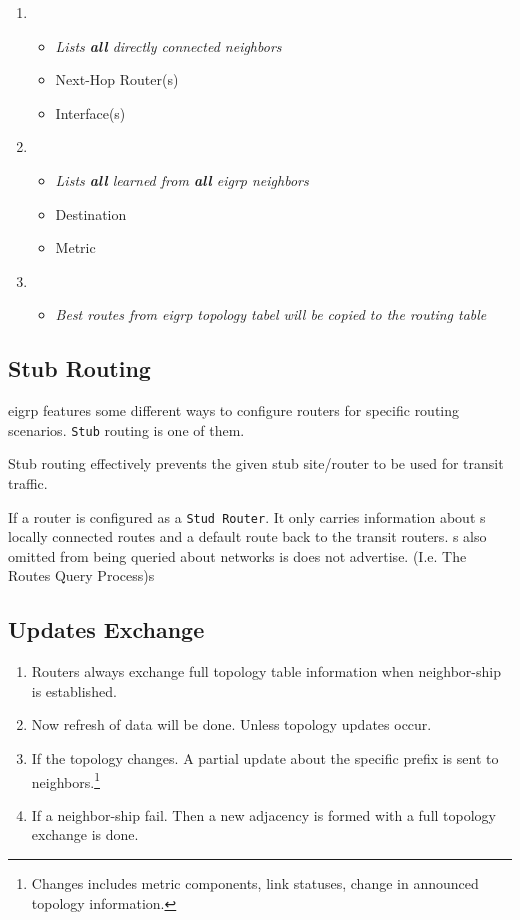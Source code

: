 \begin{enumerate}
    \item {}
    \begin{itemize}
        \item \textit{Lists \textbf{all} directly connected neighbors}
        \item Next-Hop Router(s)
        \item Interface(s)
    \end{itemize}
    \item {}
    \begin{itemize}
        \item \textit{Lists \textbf{all} learned from \textbf{all} \gls{eigrp} neighbors}
        \item Destination
        \item Metric
    \end{itemize}
    \item {}
    \begin{itemize}
        \item \textit{Best routes from \gls{eigrp} topology tabel will be copied to the routing table}
    \end{itemize}
\end{enumerate}

\subsection{Stub Routing}

\gls{eigrp} features some different ways to configure routers for specific routing scenarios. \texttt{Stub} routing is one of them.

Stub routing effectively prevents the given stub site/router to be used for transit traffic.

If a router is configured as a \texttt{Stud Router}. It only carries information about s locally connected routes and a default route back to the transit routers. s also omitted from being queried about networks is does not advertise. {\small (I.e. The Routes Query Process)}s

\subsection{Updates Exchange}

\begin{enumerate}
    \item Routers always exchange full topology table information when neighbor-ship is established.
    \item Now refresh of data will be done. Unless topology updates occur.
    \item If the topology changes. A partial update about the specific prefix is sent to neighbors.\footnote{Changes includes metric components, link statuses, change in announced topology information.}
    \item If a neighbor-ship fail. Then a new adjacency is formed with a full topology exchange is done.
\end{enumerate}

